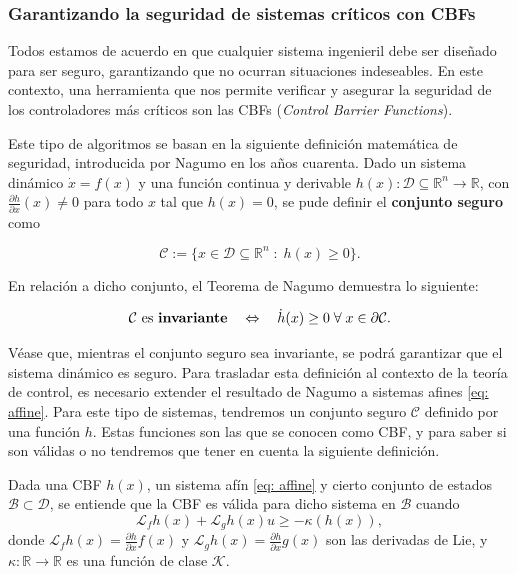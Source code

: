 
\subsubsection{Garantizando la seguridad de sistemas críticos con CBFs}

Todos estamos de acuerdo en que cualquier sistema ingenieril debe ser diseñado para ser seguro, garantizando que no ocurran situaciones indeseables. En este contexto, una herramienta que nos permite verificar y asegurar la seguridad de los controladores más críticos son las CBFs (\textit{Control Barrier Functions}).

Este tipo de algoritmos se basan en la siguiente definición matemática de seguridad, introducida por Nagumo en los años cuarenta. Dado un sistema dinámico $\dot x = f(x)$ y una función continua y derivable $h(x) : \mathcal{D} \subseteq \mathds{R}^n \rightarrow \mathds{R}$, con $\frac{\partial h}{\partial x}(x) \neq 0$ para todo $x$ tal que $h(x) = 0$, se pude definir el \textbf{conjunto seguro} como

$$\mathcal{C} := \{x \in \mathcal{D} \subseteq \mathds{R}^n \; : \; h(x) \geq 0\}.$$ 

En relación a dicho conjunto, el Teorema de Nagumo demuestra lo siguiente:

\begin{equation} \label{eq: nagumo}
    \mathcal{C} \text{ es \textbf{invariante}} \quad \Leftrightarrow \quad \dot h(x) \geq 0 \; \forall \; x \in \partial \mathcal{C}.
\end{equation}

Véase que, mientras el conjunto seguro sea invariante, se podrá garantizar que el sistema dinámico es seguro. Para trasladar esta definición al contexto de la teoría de control, es necesario extender el resultado de Nagumo a sistemas afines \eqref{eq: affine}. Para este tipo de sistemas, tendremos un conjunto seguro $\mathcal{C}$ definido por una función $h$. Estas funciones son las que se conocen como CBF, y para saber si son válidas o no tendremos que tener en cuenta la siguiente definición.

\vspace{0.2cm}
\begin{definition} 
    Dada una CBF $h(x)$, un sistema afín \eqref{eq: affine} y cierto conjunto de estados $\mathcal{B} \subset \mathcal{D}$, se entiende que la CBF es válida para dicho sistema en $\mathcal{B}$ cuando
    \begin{equation} \label{eq: CBF_cond}
        \mathcal{L}_f h(x) + \mathcal{L}_g h(x)u \geq - \kappa(h(x)), 
    \end{equation}
    donde $\mathcal{L}_f h(x) = \frac{\partial h}{\partial x}f(x)$ y $\mathcal{L}_g h(x) = \frac{\partial h}{\partial x}g(x)$ son las derivadas de Lie, y $\kappa : \mathds{R} \rightarrow \mathds{R}$ es una función de clase $\mathcal{K}$.
\end{definition}

